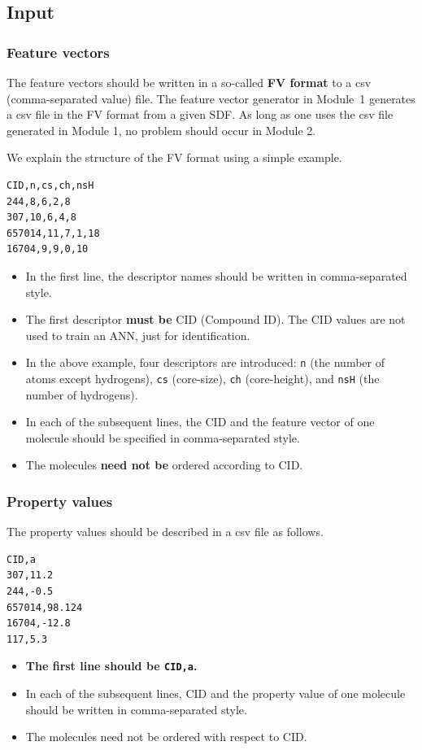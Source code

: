 \documentclass[11pt, titlepage, dvipdfmx, twoside]{article}
\begin{document}
\subsection{Input}
\subsubsection{Feature vectors}
The feature vectors should be written in
a so-called {\bf FV format} to
a csv (comma-separated value) file. 
%
The feature vector generator in Module~1
generates a csv file in the FV format
from a given SDF.
As long as one uses the csv file generated in Module 1,
no problem should occur in Module 2. 

We explain the structure of the FV format using a simple example.  
\begin{oframed}
  {\small
\begin{verbatim}
CID,n,cs,ch,nsH
244,8,6,2,8
307,10,6,4,8
657014,11,7,1,18
16704,9,9,0,10
\end{verbatim}
}
\end{oframed}
\begin{itemize}
\item In the first line, the descriptor names should be written in comma-separated style.  
\item The first descriptor {\bf must be} CID (Compound ID).
  The CID values are not used to train an ANN, just for identification. 
\item In the above example,
  four descriptors are introduced: 
  \verb|n| (the number of atoms except hydrogens),
  \verb|cs| (core-size),
  \verb|ch| (core-height), and
  \verb|nsH| (the number of hydrogens). 
\item In each of the subsequent lines,
  the CID and the feature vector of one molecule
  should be specified in comma-separated style. 
\item The molecules {\bf need not be} ordered according to CID. 
\end{itemize}


\subsubsection{Property values}
The property values should be described in a csv file as follows.  
\begin{oframed}
  {\small
\begin{verbatim}
CID,a
307,11.2
244,-0.5
657014,98.124
16704,-12.8
117,5.3
\end{verbatim}
}
\end{oframed}
\begin{itemize}
\item {\bf The first line should be \verb|CID,a|. }
\item In each of the subsequent lines,
  CID and the property value of one molecule
  should be written in comma-separated style. 
\item The molecules need not be ordered with respect to CID. 
\end{itemize}
  
\end{document}
